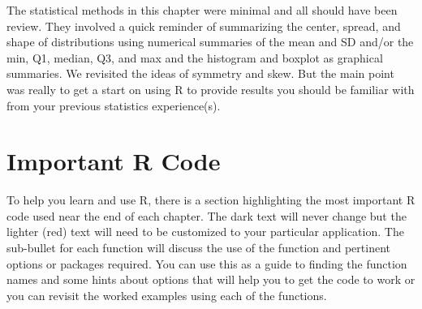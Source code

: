 \documentclass[]{book}
\begin{document}
The statistical methods in this chapter were minimal and all should have
been review. They involved a quick reminder of summarizing the center,
spread, and shape of distributions using numerical summaries of the mean
and SD and/or the min, Q1, median, Q3, and max and the histogram and
boxplot as graphical summaries. We revisited the ideas of symmetry and
skew. But the main point was really to get a start on using R to provide
results you should be familiar with from your previous statistics
experience(s).

\section{Important R Code}\label{important-r-code}

To help you learn and use R, there is a section highlighting the most
important R code used near the end of each chapter. The dark text will
never change but the lighter (red) text will need to be customized to
your particular application. The sub-bullet for each function will
discuss the use of the function and pertinent options or packages
required. You can use this as a guide to finding the function names and
some hints about options that will help you to get the code to work or
you can revisit the worked examples using each of the functions.
\end{document}
